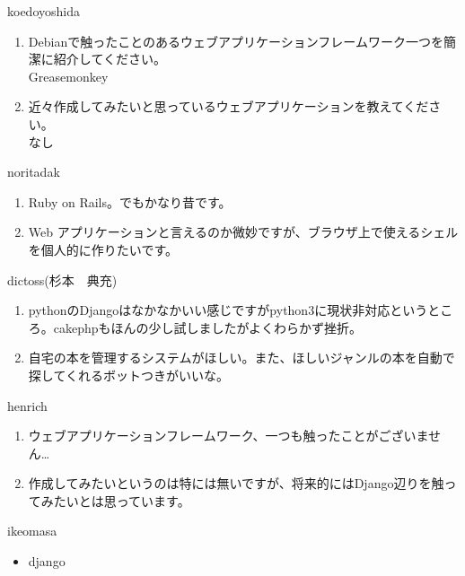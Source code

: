\begin{prework}{ koedoyoshida }
\begin{enumerate}
\item  Debianで触ったことのあるウェブアプリケーションフレームワーク一つを簡潔に紹介してください。\\
Greasemonkey
\item 近々作成してみたいと思っているウェブアプリケーションを教えてください。\\
なし 
\end{enumerate}
\end{prework}

\begin{prework}{ noritadak }
\begin{enumerate}
\item Ruby on Rails。でもかなり昔です。
\item Web アプリケーションと言えるのか微妙ですが、ブラウザ上で使えるシェルを個人的に作りたいです。
\end{enumerate}
\end{prework}

\begin{prework}{ dictoss(杉本　典充) }
\begin{enumerate}
\item pythonのDjangoはなかなかいい感じですがpython3に現状非対応というところ。cakephpもほんの少し試しましたがよくわらかず挫折。
\item 自宅の本を管理するシステムがほしい。また、ほしいジャンルの本を自動で探してくれるボットつきがいいな。
\end{enumerate}
\end{prework}

\begin{prework}{ henrich }
\begin{enumerate}
\item ウェブアプリケーションフレームワーク、一つも触ったことがございません…
\item 作成してみたいというのは特には無いですが、将来的にはDjango辺りを触ってみたいとは思っています。
\end{enumerate}
\end{prework}

\begin{prework}{ ikeomasa }
\begin{itemize}
\item django
\end{itemize}
\end{prework}

